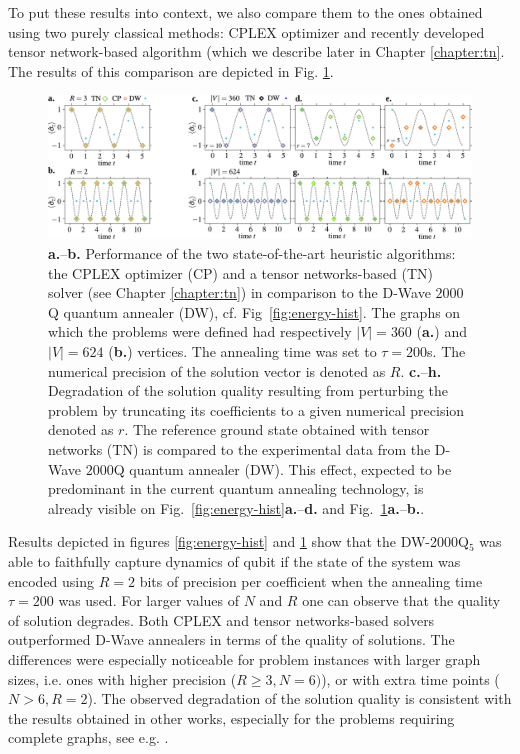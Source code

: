 To put these results into context, we also compare them to the ones obtained
using two purely classical methods: CPLEX optimizer and recently developed
tensor network-based algorithm (which we describe later in Chapter
\ref{chapter:tn}. The results of this comparison are depicted in Fig.
\ref{fig:cplex_tn_dwave}.

\begin{figure}
  \centering
  \includegraphics[width=\textwidth]{figures/fig34_merge.pdf}
  \caption{ \textbf{a.}--\textbf{b.} Performance of the two state-of-the-art heuristic
    algorithms: the CPLEX optimizer (CP) and a tensor networks-based (TN) solver
    (see Chapter \ref{chapter:tn}) in comparison to the D-Wave $2000$Q quantum annealer (DW),
    cf. Fig~\ref{fig:energy-hist}. The graphs on which the problems were defined
    had respectively $|V|=360$ (\textbf{a.}) and $|V|=624$ (\textbf{b.}) vertices. The annealing time was set
    to $\tau=200$\textmu{}s. The numerical precision of the solution vector is
    denoted as $R$. %
    \textbf{c.}--\textbf{h.} Degradation of the solution quality resulting from perturbing the
    problem by truncating its coefficients to a given
    numerical precision denoted as $r$. The reference ground state obtained
    with tensor networks (TN) is compared to the  experimental data from the
    D-Wave $2000$Q quantum annealer (DW). This effect, expected to be predominant
    in the current quantum annealing technology, is already visible on
    Fig.~\ref{fig:energy-hist}\textbf{a.}--\textbf{d.} and Fig.~\ref{fig:cplex_tn_dwave}\textbf{a.}--\textbf{b.}.
  }
  \label{fig:cplex_tn_dwave}
\end{figure}

Results depicted in figures \ref{fig:energy-hist} and \ref{fig:cplex_tn_dwave}
show that the DW-2000Q$_{5}$ was able to faithfully capture dynamics of qubit
if the state of the system was encoded using $R=2$ bits of precision per
coefficient when the annealing time $\tau=200$ was used. For larger values of
$N$ and $R$ one can observe that the quality of solution degrades. Both CPLEX
and tensor networks-based solvers outperformed D-Wave annealers in terms of the
quality of solutions. The differences were especially noticeable for problem
instances with larger graph sizes, i.e. ones with higher precision ($R \ge 3,
  N=6)$), or with extra time points ($N > 6, R = 2$). The observed degradation of
the solution quality is consistent with the results obtained in other works,
especially for the problems requiring complete graphs, see e.g.
\cite{Hamerly2019}.

